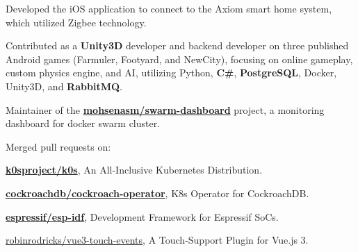 \documentclass[letterpaper]{deedy-resume} %
\begin{document}
\begin{minipage}[t]{0.66\textwidth}
\begin{tightitemize}
\end{tightitemize}

\sectionspace %



\begin{tightitemize}
\item Developed the iOS application to connect to the Axiom smart home system, which utilized Zigbee technology.
\end{tightitemize}

\sectionspace %



\begin{tightitemize}
\item Contributed as a {\bf Unity3D} developer and backend developer on three published Android games (Farmuler, Footyard, and NewCity), focusing on online gameplay, custom physics engine, and AI, utilizing Python, {\bf C\#}, {\bf PostgreSQL}, Docker, Unity3D, and {\bf RabbitMQ}.
\end{tightitemize}

\sectionspace %



\descript{}
\nolocation
\begin{tightitemize}
\item Maintainer of the \href{https://github.com/mohsenasm/swarm-dashboard}{\bf mohsenasm/swarm-dashboard} project, a monitoring dashboard for docker swarm cluster.
\item Merged pull requests on:
\vspace{0.2cm}
\begin{tightitemize}
\item \href{https://github.com/k0sproject/k0s}{\bf k0sproject/k0s}{\footnotesize , An All-Inclusive Kubernetes Distribution.}
\item \href{https://github.com/cockroachdb/cockroach-operator}{\bf cockroachdb/cockroach-operator}{\footnotesize , K8s Operator for CockroachDB.}
\item \href{https://github.com/espressif/esp-idf}{\bf espressif/esp-idf}{\footnotesize , Development Framework for Espressif SoCs.}
\item \href{https://github.com/robinrodricks/vue3-touch-events}{robinrodricks/vue3-touch-events}{\footnotesize , A Touch-Support Plugin for Vue.js 3.}
\end{tightitemize}
\end{tightitemize}


\end{minipage}
\end{document}
